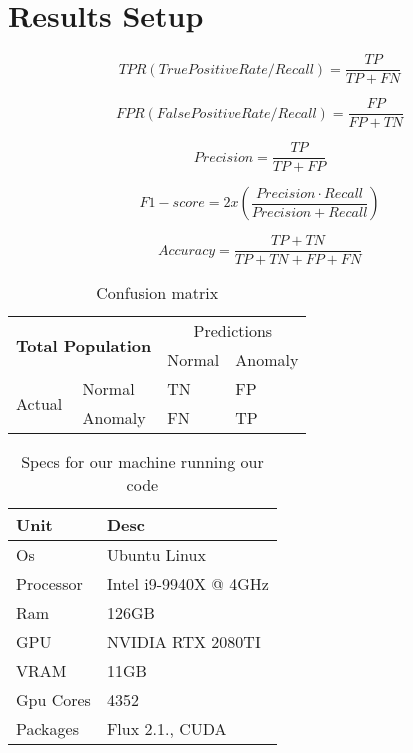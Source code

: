 \section{Results Setup}

\begin{equation}
    TPR(TruePositiveRate/Recall) = \frac{TP}{TP + FN}
\end{equation}

\begin{equation}
    FPR(FalsePositiveRate/Recall) = \frac{FP}{FP + TN}
\end{equation}

\begin{equation}
    Precision = \frac{TP}{TP + FP}
\end{equation}

\begin{equation}
    F1 - score = 2 x (\frac{Precision \cdot Recall}{Precision + Recall})
\end{equation}

\begin{equation}
    Accuracy = \frac{TP + TN}{TP + TN + FP + FN}
\end{equation}


\begin{table}[h]
\centering
\begin{tabular}{|ll|ll|}
\hline
\multicolumn{2}{|c|}{\multirow{2}{*}{\textbf{Total Population}}} & \multicolumn{2}{c|}{Predictions}      \\ \cline{3-4} 
\multicolumn{2}{|c|}{}                                           & \multicolumn{1}{l|}{Normal} & Anomaly \\ \hline
\multicolumn{1}{|l|}{\multirow{2}{*}{Actual}}      & Normal      & \multicolumn{1}{l|}{TN}     & FP      \\ \cline{2-4} 
\multicolumn{1}{|l|}{}                             & Anomaly     & \multicolumn{1}{l|}{FN}     & TP      \\ \hline
\end{tabular}
\label{tab:confmat}
\caption{Confusion matrix}
\end{table}

\begin{table}[h]
\centering
\begin{tabular}{|l|l|}
\hline
\textbf{Unit} & \textbf{Desc}         \\ \hline
Os            & Ubuntu Linux          \\ \hline
Processor     & Intel i9-9940X @ 4GHz \\ \hline
Ram           & 126GB                 \\ \hline
GPU           & NVIDIA RTX 2080TI     \\ \hline
VRAM          & 11GB                  \\ \hline
Gpu Cores     & 4352                  \\ \hline
Packages      & Flux 2.1., CUDA       \\ \hline
\end{tabular}
\label{tab:specs}
\caption{Specs for our machine running our code}
\end{table}